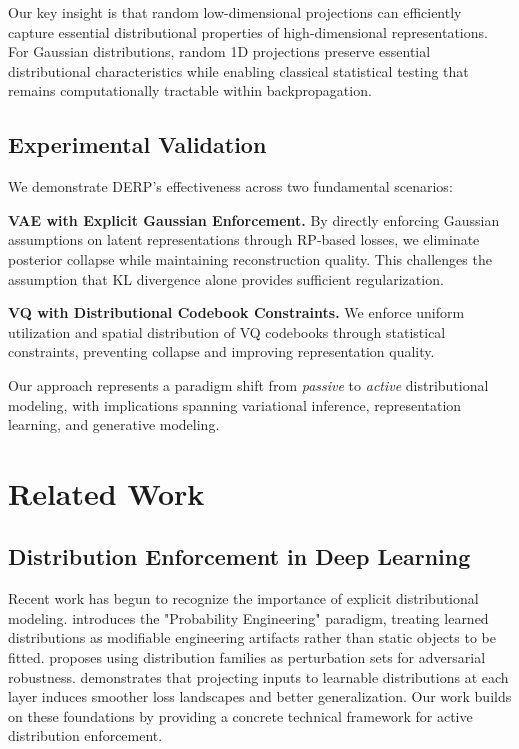 \documentclass{article}
\begin{document}
Our key insight is that random low-dimensional projections can efficiently capture essential distributional properties of high-dimensional representations. For Gaussian distributions, random 1D projections preserve essential distributional characteristics while enabling classical statistical testing that remains computationally tractable within backpropagation.

\subsection{Experimental Validation}

We demonstrate DERP's effectiveness across two fundamental scenarios:

\textbf{VAE with Explicit Gaussian Enforcement.} By directly enforcing Gaussian assumptions on latent representations through RP-based losses, we eliminate posterior collapse while maintaining reconstruction quality. This challenges the assumption that KL divergence alone provides sufficient regularization.

\textbf{VQ with Distributional Codebook Constraints.} We enforce uniform utilization and spatial distribution of VQ codebooks through statistical constraints, preventing collapse and improving representation quality.

Our approach represents a paradigm shift from \emph{passive} to \emph{active} distributional modeling, with implications spanning variational inference, representation learning, and generative modeling.

\section{Related Work}

\subsection{Distribution Enforcement in Deep Learning}

Recent work has begun to recognize the importance of explicit distributional modeling. \citet{zhang2025advancing} introduces the "Probability Engineering" paradigm, treating learned distributions as modifiable engineering artifacts rather than static objects to be fitted. \citet{ahmadi2024distributional} proposes using distribution families as perturbation sets for adversarial robustness. \citet{hao2025towards} demonstrates that projecting inputs to learnable distributions at each layer induces smoother loss landscapes and better generalization. Our work builds on these foundations by providing a concrete technical framework for active distribution enforcement.
\end{document}
